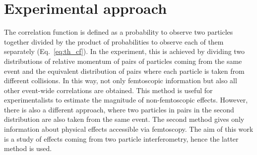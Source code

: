   \section{Experimental approach}
  \label{sec:exp-approach}
    The correlation function is defined as a probability to observe two particles together divided by the product of probabilities to observe each of them separately (Eq.~\ref{eq:th_cf}). 
    In the experiment, this is achieved by dividing two distributions of relative momentum of pairs of particles coming from the same event and the equivalent distribution of pairs where each particle is taken from different collisions.
    In this way, not only femtoscopic information but also all other event-wide correlations are obtained.
    This method is useful for experimentalists to estimate the magnitude of non-femtoscopic effects.
    However, there is also a different approach, where two particles in pairs in the second distribution are also taken from the same event.
    The second method gives only information about physical effects accessible via femtoscopy.
    The aim of this work is a study of effects coming from two particle interferometry, hence the latter method is used. 

